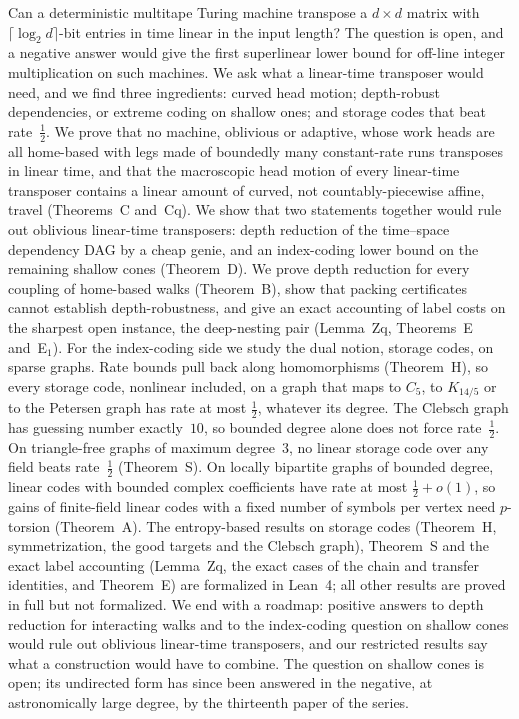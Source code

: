 Can a deterministic multitape Turing machine transpose a $d\times d$ matrix with $\lceil\log_2 d\rceil$-bit entries in time
linear in the input length? The question is open, and a negative answer would give the first superlinear lower bound for
off-line integer multiplication on such machines. We ask what a linear-time transposer would need, and we find three
ingredients: curved head motion; depth-robust dependencies, or extreme coding on shallow ones; and storage codes
that beat rate~$\tfrac12$.
We prove that no machine, oblivious or adaptive, whose work heads are all home-based with legs made of boundedly
many constant-rate runs transposes in linear time, and that the macroscopic head motion of every linear-time transposer
contains a linear amount of curved, not countably-piecewise affine, travel (Theorems~C and~Cq). We show that two statements together would
rule out oblivious linear-time transposers: depth reduction of the time--space dependency DAG by a cheap genie, and an
index-coding lower bound on the remaining shallow cones (Theorem~D). We prove depth reduction for every coupling of
home-based walks (Theorem~B), show that packing certificates cannot establish depth-robustness, and give an exact
accounting of label costs on the sharpest open instance, the deep-nesting pair (Lemma~Zq, Theorems~E and~E$_1$). For the index-coding side we study the dual notion, storage codes, on sparse graphs. Rate bounds pull back along
homomorphisms (Theorem~H), so every storage code, nonlinear included, on a graph that maps to $C_5$, to $K_{14/5}$ or to
the Petersen graph has rate at most $\tfrac12$, whatever its degree. The Clebsch graph has guessing number exactly~$10$, so bounded degree alone does not force rate~$\tfrac12$.
On triangle-free graphs of maximum degree~$3$, no linear storage code over any field beats rate~$\tfrac12$ (Theorem~S).
On locally bipartite graphs of bounded degree, linear codes with bounded complex coefficients have rate at most
$\tfrac12+o(1)$, so gains of finite-field linear codes with a fixed number of symbols per vertex need
$p$-torsion (Theorem~A). The entropy-based results on storage codes (Theorem~H, symmetrization, the good targets and the Clebsch graph),
Theorem~S and the exact label accounting (Lemma~Zq, the exact cases of the chain and transfer identities, and
Theorem~E) are formalized in Lean~4; all other results are proved in full but not formalized. We end with a roadmap: positive answers to depth reduction for interacting walks and to the index-coding
question on shallow cones would
rule out oblivious linear-time transposers,
and our restricted results say what a construction would have to combine. The question on shallow cones is open; its
undirected form has since been answered in the negative, at astronomically large degree, by the thirteenth paper of the
series.
